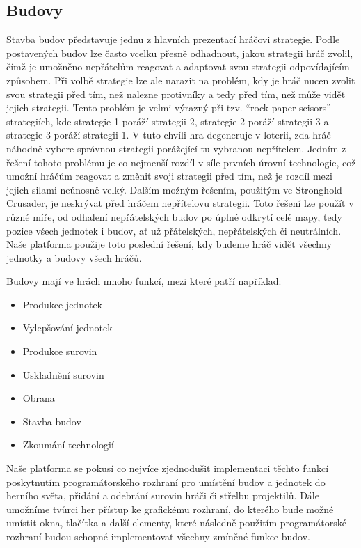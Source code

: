 \subsection{Budovy}
\label{sec:budovy}
Stavba budov představuje jednu z hlavních prezentací hráčovi strategie. Podle postavených budov lze často vcelku přesně odhadnout, jakou strategii hráč zvolil, čímž je umožněno nepřátelům reagovat a adaptovat svou strategii odpovídajícím způsobem. 
Při volbě strategie lze ale narazit na problém, kdy je hráč nucen zvolit svou strategii před tím, než nalezne protivníky a tedy před tím, než může vidět jejich strategii. Tento problém je velmi výrazný při tzv.  ``rock-paper-scisors'' strategiích, kde strategie 1 poráží strategii 2, strategie 2 poráží strategii 3 a strategie 3 poráží strategii 1. V tuto chvíli hra degeneruje v loterii, zda hráč náhodně vybere správnou strategii porážející tu vybranou nepřítelem.\citep{book:gamefund} Jedním z řešení tohoto problému je co nejmenší rozdíl v síle prvních úrovní technologie, což umožní hráčům reagovat a změnit svoji strategii před tím, než je rozdíl mezi jejich silami neúnosně velký. \citep{site:oxeye03} Dalším možným řešením, použitým ve Stronghold Crusader, je neskrývat před hráčem nepřítelovu strategii. Toto řešení lze použít v různé míře, od odhalení nepřátelských budov po úplné odkrytí celé mapy, tedy pozice všech jednotek i budov, ať už přátelských, nepřátelských či neutrálních. Naše platforma použije toto poslední řešení, kdy budeme hráč vidět všechny jednotky a budovy všech hráčů.

Budovy mají ve hrách mnoho funkcí, mezi které patří například:
\begin{itemize}
	\item Produkce jednotek
	\item Vylepšování jednotek
	\item Produkce surovin
	\item Uskladnění surovin
	\item Obrana
	\item Stavba budov
	\item Zkoumání technologií
\end{itemize}


Naše platforma se pokusí co nejvíce zjednodušit implementaci těchto funkcí poskytnutím programátorského rozhraní pro umístění budov a jednotek do herního světa, přidání a odebrání surovin hráči či střelbu projektilů. Dále umožníme tvůrci her přístup ke grafickému rozhraní, do kterého bude možné umístit okna, tlačítka a další elementy, které následně použitím programátorské rozhraní budou schopné implementovat všechny zmíněné funkce budov.  

